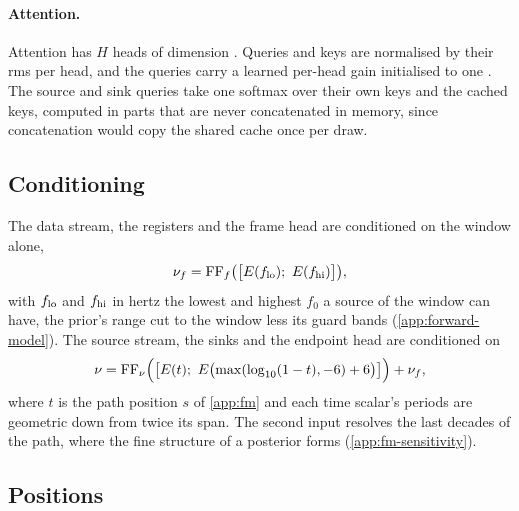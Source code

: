 \paragraph{Attention.}
Attention has $H$ heads of dimension \NetworkHeadDim{}. Queries and keys are normalised by their
\ac{rms} per head, and the queries carry a learned per-head gain initialised to one
\citep{henry2020query,dehghani2023scaling}. The source and sink queries take one softmax over their
own keys and the cached keys, computed in parts that are never concatenated in memory, since
concatenation would copy the shared cache once per draw.

\subsection{Conditioning}
\label{app:network-conditioning}

The data stream, the registers and the frame head are conditioned on the window alone,
\begin{equation}
  \nu_f = \mathrm{FF}_f\bigl(\bigl[E(f_{\rm lo});\ E(f_{\rm hi})\bigr]\bigr),
\end{equation}
with $f_{\rm lo}$ and $f_{\rm hi}$ in hertz the lowest and highest $f_0$ a source of the window can
have, the prior's range cut to the window less its guard bands (\cref{app:forward-model}). The
source stream, the sinks and the endpoint head are conditioned on
\begin{equation}
  \nu = \mathrm{FF}_\nu\Bigl(\bigl[E(t);\ E\bigl(\max(\log_{10}(1-t), -\NetworkTimeDecades{}) +
  \NetworkTimeDecades{}\bigr)\bigr]\Bigr) + \nu_f,
  \label{eq:network-c}
\end{equation}
where $t$ is the path position $s$ of \cref{app:fm} and each time scalar's periods are geometric
down from twice its span. The second input resolves the last decades of the path, where the fine
structure of a posterior forms (\cref{app:fm-sensitivity}).

\subsection{Positions}
\label{app:network-positions}


